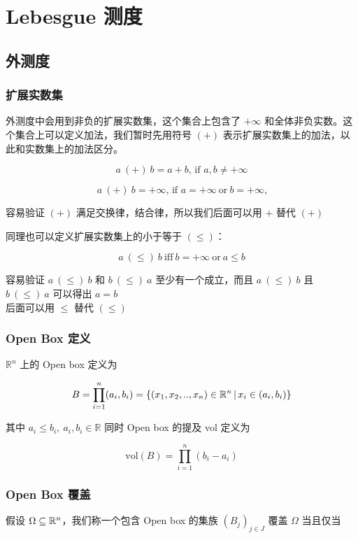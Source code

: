 \chapter{Lebesgue 测度}

\section{外测度}

\subsection{扩展实数集}

外测度中会用到非负的扩展实数集，这个集合上包含了 $+\infty$ 和全体非负实数。这个集合上可以定义加法，我们暂时先用符号 $\mathit{(+)}$ 表示扩展实数集上的加法，以此和实数集上的加法区分。

\[
    a \: (+) \: b = a + b,\, \text{if }a,b \ne +\infty
\]

\[
     \: a \:(+)\: b = +\infty,\, \text{if }a = +\infty \: \text{or} \: b = +\infty,
\]

容易验证 $(+)$ 满足交换律，结合律，所以我们后面可以用 $+$ 替代 $(+)$

同理也可以定义扩展实数集上的小于等于 $(\le)$：

\[
a \:(\le)\: b \: \text{iff} \: b = +\infty \: \text{or} \: a \le b
\]

容易验证 $a \:(\le)\: b$ 和 $b \:(\le)\: a$ 至少有一个成立，而且 $a \:(\le)\: b$ 且 $b \:(\le)\: a$ 可以得出 $a = b$\\
后面可以用 $\le$ 替代 $(\le)$

\subsection{Open Box 定义}

$\mathbb{R}^{n}$ 上的 Open box 定义为 

\[
B = \prod_{i=1}^{n}(a_i, b_i) = \{ (x_1, x_2, .., x_n) \in \mathbb{R}^n \,\vert\, x_i \in (a_i, b_i) \}
\]

其中 $a_i \le b_i, \: a_i, b_i \in \mathbb{R}$ 同时 Open box 的提及 vol 定义为

\[
\text{vol}(B) = \prod_{i=1}^{n}(b_i - a_i)
\]

\subsection{Open Box 覆盖}

假设 $\Omega \subseteq \mathbb{R}^n$，我们称一个包含 Open box 的集族 $(B_j)_{j \in J}  $ 覆盖  $ \Omega $ 当且仅当 

